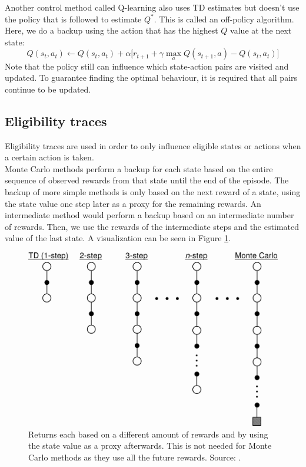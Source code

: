 \documentclass[a4paper]{article}
\begin{document}
Another control method called Q-learning also uses TD estimates but doesn't use the policy that is followed to estimate $Q^*$. This is called an off-policy algorithm. Here, we do a backup using the action that has the highest $Q$ value at the next state:
\begin{equation}
Q(s_t,a_t) \leftarrow Q(s_t,a_t) + \alpha \big[ r_{t+1} + \gamma \max_{a} Q(s_{t+1}, a) - Q(s_t,a_t) \big]
\end{equation}
Note that the policy still can influence which state-action pairs are visited and updated. To guarantee finding the optimal behaviour, it is required that all pairs continue to be updated.\\

\subsection{Eligibility traces}
Eligibility traces are used in order to only influence eligible states or actions when a certain action is taken.\\
Monte Carlo methods perform a backup for each state based on the entire sequence of observed rewards from that state until the end of the episode. The backup of more simple methods is only based on the next reward of a state, using the state value one step later as a proxy for the remaining rewards. An intermediate method would perform a backup based on an intermediate number of rewards. Then, we use the rewards of the intermediate steps and the estimated value of the last state. A visualization can be seen in Figure \ref{fig:nStepTD}.
\begin{figure}[H]
\includegraphics[width=\linewidth]{images/nStepTD.png}
\caption{Returns each based on a different amount of rewards and by using the state value as a proxy afterwards. This is not needed for Monte Carlo methods as they use all the future rewards. Source: \cite{Sutton1998ReinforcementIntroductionb}.}
\label{fig:nStepTD}
\end{figure}
\end{document}
